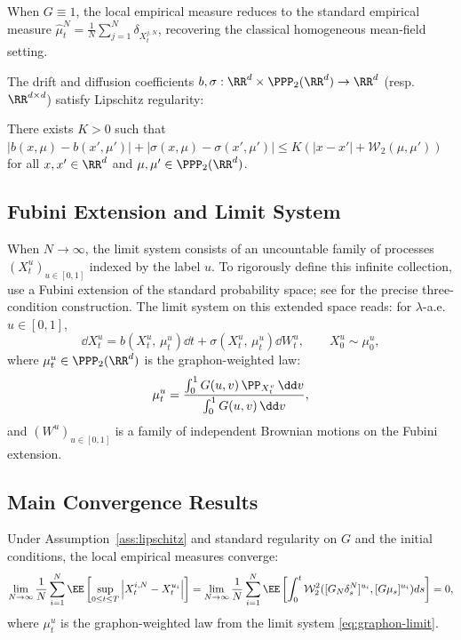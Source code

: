 \documentclass[11pt]{article}
\begin{document}
\begin{remark}
  When $G \equiv 1$, the local empirical measure reduces to the standard empirical measure $\hat{\mu}_t^N = \frac{1}{N}\sum_{j=1}^N \delta_{X_t^{j,N}}$, recovering the classical homogeneous mean-field setting.
\end{remark}

The drift and diffusion coefficients $b, \sigma : \RR^d \times \PPP_2(\RR^d) \to \RR^d$ (resp.\ $\RR^{d \times d}$) satisfy Lipschitz regularity:
\begin{assumption}\label{ass:lipschitz}
  There exists $K > 0$ such that $|b(x,\mu) - b(x',\mu')| + |\sigma(x,\mu) - \sigma(x',\mu')| \le K(|x-x'| + \mathcal{W}_2(\mu,\mu'))$ for all $x, x' \in \RR^d$ and $\mu, \mu' \in \PPP_2(\RR^d)$.
\end{assumption}

\subsection{Fubini Extension and Limit System}\label{sec:fubini}

When $N \to \infty$, the limit system consists of an uncountable family of processes $(X_t^u)_{u \in [0,1]}$ indexed by the label $u$. To rigorously define this infinite collection, \citet{coppini2025graphon} use a Fubini extension of the standard probability space; see \citet[Definition~3.1]{coppini2025graphon} for the precise three-condition construction. The limit system on this extended space reads: for $\lambda$-a.e.\ $u \in [0,1]$,
\begin{equation}\label{eq:graphon-limit}
  \dd X_t^u = b\!\left(X_t^u, \, \mu_t^u\right)\dd t + \sigma\!\left(X_t^u, \, \mu_t^u\right)\dd W_t^u, \qquad X_0^u \sim \mu_0^u,
\end{equation}
where $\mu_t^u \in \PPP_2(\RR^d)$ is the graphon-weighted law:
\begin{equation}\label{eq:graphon-law}
  \mu_t^u = \frac{\int_0^1 G(u,v)\,\PP_{X_t^v}\,\dd v}{\int_0^1 G(u,v)\,\dd v},
\end{equation}
and $(W^u)_{u \in [0,1]}$ is a family of independent Brownian motions on the Fubini extension.

\subsection{Main Convergence Results}

\begin{theorem}\label{thm:lln}
  Under Assumption~\ref{ass:lipschitz} and standard regularity on $G$ and the initial conditions, the local empirical measures converge:
  \begin{equation}
    \lim_{N \to \infty} \frac{1}{N} \sum_{i=1}^N \EE\left[ \sup_{0 \leq t \leq T} \left| X_t^{i, N} - X_t^{u_i} \right| \right] = \lim_{N \to \infty} \frac{1}{N} \sum_{i=1}^N \EE\left[ \int_{0}^{t} \mathcal{W}_2^2 ([G_N \delta_s^N]^{u_i}, [G\mu_s]^{u_i}) ds \right] = 0,
  \end{equation}
  where $\mu_t^u$ is the graphon-weighted law from the limit system \eqref{eq:graphon-limit}.
\end{theorem}
\end{document}
